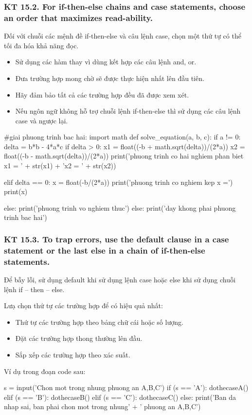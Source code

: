\documentclass[12pt]{report}
\begin{document}
\subsubsection{KT 15.2. For if-then-else chains and case statements, choose an order that maximizes read-ability.}
Đối với chuỗi các mệnh đề if-then-else và câu lệnh case, chọn một thứ tự có thể tối đa hóa khả năng đọc.
\begin{itemize}
	\item Sử dụng các hàm thay vì dùng kết hợp các câu lệnh and, or.
	\item Đưa trường hợp mong chờ sẽ được thực hiện nhất lên đầu tiên.
	\item Hãy đảm bảo tất cả các trường hợp đều đã được xem xét.
	\item Nếu ngôn ngữ không hỗ trợ chuỗi lệnh if-then-else thì sử dụng các câu lệnh case và ngược lại.
\end{itemize}

\begin{python}
#giai phuong trinh bac hai:
import math
def solve_equation(a, b, c):
	if a != 0:
		delta = b*b - 4*a*c
		if delta > 0:
            x1 = float((-b + math.sqrt(delta))/(2*a))
			x2 = float((-b - math.sqrt(delta))/(2*a))
			print('phuong trinh co hai nghiem phan biet x1 = ' 
							+ str(x1) + 'x2 = ' + str(x2))
			
		elif delta == 0:
			x = float(-b/(2*a))
			print('phuong trinh co nghiem kep x =')
			print(x)

		else:
			print('phuong trinh vo nghiem thuc')
	else:
		print('day khong phai phuong trinh bac hai')
\end{python}

\subsubsection{KT 15.3. To trap errors, use the default clause in a case statement or the last else in a chain of if-then-else statements.}
Để bẫy lỗi, sử dụng default khi sử dụng lệnh case hoặc else khi sử dụng chuỗi lệnh if – then – else.
\vspace*{3mm}

Lưạ chọn thứ tự các trường hợp để có hiệu quả nhất:
\begin{itemize}
	\item Thứ tự các trường hợp theo bảng chữ cái hoặc số lượng.
	\item Đặt các trường hợp thong thường lên đầu.
	\item Sắp xếp các trường hợp theo xác suất.
\end{itemize}
Ví dụ trong đoạn code sau: 
\begin{python}
s = input('Chon mot trong nhung phuong an A,B,C')
if (s == 'A'):
	dothecaseA()
elif (s == 'B'):
	dothecaseB()
elif (s == 'C'):
	dothecaseC()
else:
	print('Ban da nhap sai, ban phai chon mot trong nhung' +
		' phuong an A,B,C')
\end{python}
\end{document}
